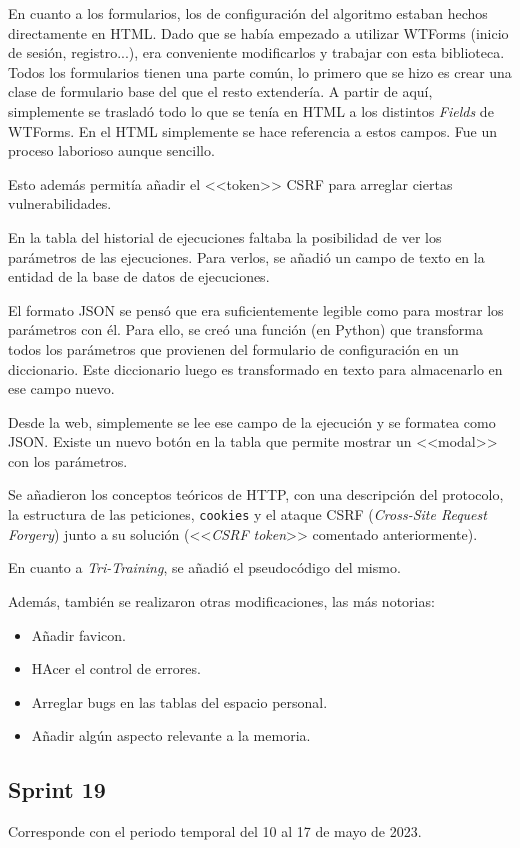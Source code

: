 En cuanto a los formularios, los de configuración del algoritmo estaban hechos
directamente en HTML. Dado que se había empezado a utilizar WTForms (inicio de
sesión, registro...), era conveniente modificarlos y trabajar con esta
biblioteca. Todos los formularios tienen una parte común, lo primero que se hizo
es crear una clase de formulario base del que el resto extendería. A partir de
aquí, simplemente se trasladó todo lo que se tenía en HTML a los distintos
\textit{Fields} de WTForms. En el HTML simplemente se hace referencia a estos
campos. Fue un proceso laborioso aunque sencillo.

Esto además permitía añadir el <<token>> CSRF para arreglar ciertas
vulnerabilidades.

En la tabla del historial de ejecuciones faltaba la posibilidad de ver los
parámetros de las ejecuciones. Para verlos, se añadió un campo de texto en la
entidad de la base de datos de ejecuciones. 

El formato JSON se pensó que era suficientemente legible como para mostrar los
parámetros con él. Para ello, se creó una función (en Python) que transforma
todos los parámetros que provienen del formulario de configuración en un
diccionario. Este diccionario luego es transformado en texto para almacenarlo en
ese campo nuevo.

Desde la web, simplemente se lee ese campo de la ejecución y se formatea como
JSON. Existe un nuevo botón en la tabla que permite mostrar un <<modal>> con los
parámetros.

Se añadieron los conceptos teóricos de HTTP, con una descripción del protocolo,
la estructura de las peticiones, \texttt{cookies} y el ataque CSRF
(\textit{Cross-Site Request Forgery}) junto a su solución (<<\textit{CSRF
token}>> comentado anteriormente).

En cuanto a \textit{Tri-Training}, se añadió el pseudocódigo del mismo.

Además, también se realizaron otras modificaciones, las más notorias:
\begin{itemize}
    \item Añadir favicon.
    \item HAcer el control de errores.
    \item Arreglar bugs en las tablas del espacio personal.
    \item Añadir algún aspecto relevante a la memoria.
\end{itemize}


\subsection{Sprint 19}
Corresponde con el periodo temporal del 10 al 17 de mayo de 2023.

